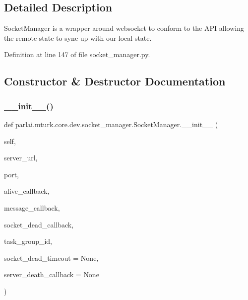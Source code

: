 \subsection{Detailed Description}
\begin{DoxyVerb}SocketManager is a wrapper around websocket to conform to the API
allowing the remote state to sync up with our local state.
\end{DoxyVerb}
 

Definition at line 147 of file socket\+\_\+manager.\+py.



\subsection{Constructor \& Destructor Documentation}
\mbox{\label{classparlai_1_1mturk_1_1core_1_1dev_1_1socket__manager_1_1SocketManager_a972e94d9fa6b2a7fdc09184e06d343dd}} 
\subsubsection{\texorpdfstring{\+\_\+\+\_\+init\+\_\+\+\_\+()}{\_\_init\_\_()}}
{\footnotesize\ttfamily def parlai.\+mturk.\+core.\+dev.\+socket\+\_\+manager.\+Socket\+Manager.\+\_\+\+\_\+init\+\_\+\+\_\+ (\begin{DoxyParamCaption}\item[{}]{self,  }\item[{}]{server\+\_\+url,  }\item[{}]{port,  }\item[{}]{alive\+\_\+callback,  }\item[{}]{message\+\_\+callback,  }\item[{}]{socket\+\_\+dead\+\_\+callback,  }\item[{}]{task\+\_\+group\+\_\+id,  }\item[{}]{socket\+\_\+dead\+\_\+timeout = {\ttfamily None},  }\item[{}]{server\+\_\+death\+\_\+callback = {\ttfamily None} }\end{DoxyParamCaption})}

